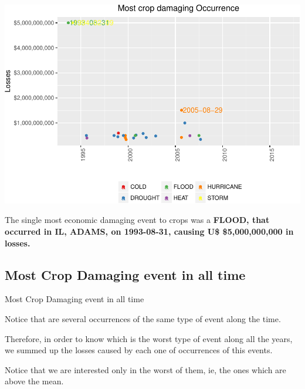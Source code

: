 \documentclass[]{article}
\begin{document}
\includegraphics{readme_files/figure-latex/crop-single-plot-1.pdf}

The single most economic damaging event to crops was a \textbf{FLOOD,
that occurred in IL, ADAMS, on 1993-08-31, causing U\$ \$5,000,000,000
in losses.}

\subsection{Most Crop Damaging event in all
time}\label{most-crop-damaging-event-in-all-time}

Most Crop Damaging event in all time

Notice that are several occurrences of the same type of event along the
time.

Therefore, in order to know which is the worst type of event along all
the years, we summed up the losses caused by each one of occurrences of
this events.

Notice that we are interested only in the worst of them, ie, the ones
which are above the mean.
\end{document}
